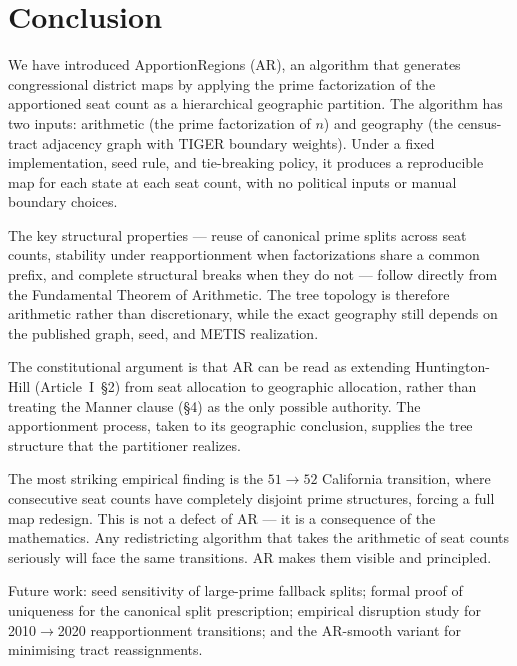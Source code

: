 \section{Conclusion}
\label{sec:conclusion}

We have introduced ApportionRegions (AR), an algorithm that
generates congressional district maps by applying the prime factorization of
the apportioned seat count as a hierarchical geographic partition. The
algorithm has two inputs: arithmetic (the prime factorization of $n$) and
geography (the census-tract adjacency graph with TIGER boundary weights).
Under a fixed implementation, seed rule, and tie-breaking policy, it produces
a reproducible map for each state at each seat count, with no political inputs
or manual boundary choices.

The key structural properties --- reuse of canonical prime splits across
seat counts, stability under reapportionment when factorizations share a
common prefix, and complete structural breaks when they do not --- follow
directly from the Fundamental Theorem of Arithmetic. The tree topology is
therefore arithmetic rather than discretionary, while the exact geography still
depends on the published graph, seed, and METIS realization.

The constitutional argument is that AR can be read as extending
Huntington-Hill (Article~I~\S2) from seat allocation to geographic allocation,
rather than treating the Manner clause (\S4) as the only possible authority.
The apportionment process, taken to its geographic conclusion, supplies the
tree structure that the partitioner realizes.

The most striking empirical finding is the $51 \to 52$ California transition,
where consecutive seat counts have completely disjoint prime structures,
forcing a full map redesign. This is not a defect of AR --- it is a
consequence of the mathematics. Any redistricting algorithm that takes the
arithmetic of seat counts seriously will face the same transitions. AR makes
them visible and principled.

Future work: seed sensitivity of large-prime fallback splits;
formal proof of uniqueness for the canonical split prescription; empirical
disruption study for 2010$\to$2020 reapportionment transitions;
and the AR-smooth variant for minimising tract reassignments.
